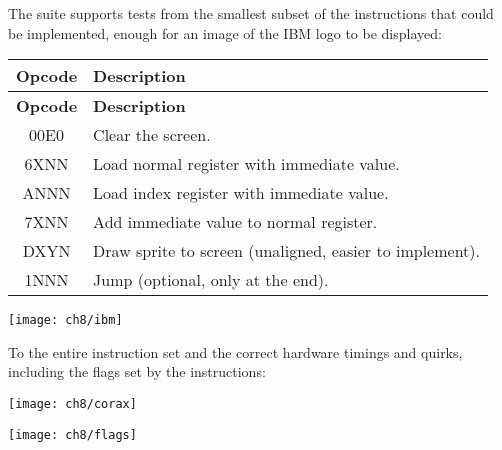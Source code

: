 \par The suite supports tests from the smallest subset of the instructions that could be implemented, enough for an image of the IBM logo to be displayed:

\begin{longtable}{|c|l|}
\hline
\textbf{Opcode} & \textbf{Description} \\ \hline
\endfirsthead

\hline
\textbf{Opcode} & \textbf{Description} \\ \hline
\endhead

\hline
\endfoot

\hline
\endlastfoot

00E0 & Clear the screen.                                        \\ \hline
6XNN & Load normal register with immediate value.               \\ \hline
ANNN & Load index register with immediate value.                \\ \hline
7XNN & Add immediate value to normal register.                  \\ \hline
DXYN & Draw sprite to screen (unaligned, easier to implement).  \\ \hline
1NNN & Jump (optional, only at the end).                        \\
\end{longtable}

\begin{minipage}{\linewidth}
\texttt{[image: ch8/ibm]}
\centering
{}
\end{minipage}

\clearpage

\par To the entire instruction set and the correct hardware timings and quirks, including the flags set by the instructions:\\

\begin{minipage}{\linewidth}
\texttt{[image: ch8/corax]}
\end{minipage}

\begin{minipage}{\linewidth}
\texttt{[image: ch8/flags]}
\centering
{}
\end{minipage}

